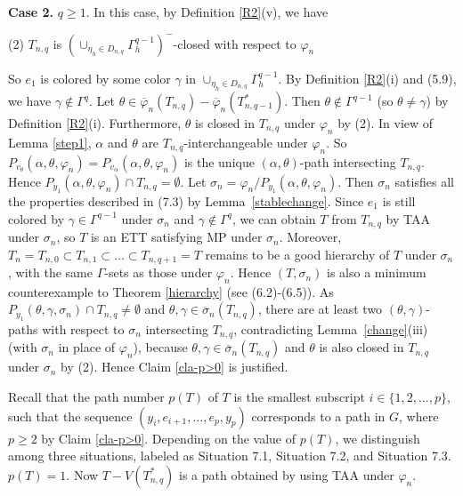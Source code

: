 \documentclass[11pt]{article}
\newcommand{\phibar}{\overline{\varphi}}
\begin{document}
{\bf Case 2.} $q\ge 1$. In this case, by Definition \ref{R2}(v), we have	

(2) $T_{n,q}$ is $(\cup_{\eta_h\in D_{n,q}}\Gamma^{q-1}_h)^-$-closed with respect to $\varphi_n$ 

\noindent So $e_1$ is colored by some color $\gamma$ in $\cup_{\eta_h\in D_{n,q}}\Gamma^{q-1}_h$. By Definition \ref{R2}(i) 
and (5.9), we have $\gamma \notin\Gamma^{q}$. Let $\theta\in\phibar_n(T_{n,q})-\phibar_n(T_{n,q-1}^*)$.
Then $\theta \notin \Gamma^{q-1}$ (so $\theta \neq\gamma$) by Definition \ref{R2}(i). Furthermore, 
$\theta$ is closed in $T_{n,q}$ under $\varphi_n$ by (2). In view of Lemma \ref{step1}, $\alpha$ and $\theta$ are $T_{n,q}$-interchangeable under $\varphi_n$. So  $P_{v_{\theta}}(\alpha,\theta,\varphi_n)=P_{v_{\alpha}}(\alpha,\theta,\varphi_n)$ 
is the unique $(\alpha,\theta)$-path intersecting $T_{n,q}$. Hence $P_{y_1}(\alpha,\theta,\varphi_n)\cap T_{n,q}=\emptyset$. 
Let $\sigma_n=\varphi_n/P_{y_1}(\alpha,\theta,\varphi_n)$. Then $\sigma_n$ satisfies all the properties described in (7.3) by Lemma~\ref{stablechange}. Since $e_1$ is still colored by $\gamma\in\Gamma^{q-1}$ under $\sigma_n$ and 
$\gamma\notin \Gamma^{q}$, we can obtain $T$ from $T_{n,q}$ by TAA under $\sigma_n$, so $T$ is an ETT satisfying MP under $\sigma_n$.  Moreover, $T_n=T_{n,0} \subset T_{n,1} \subset \ldots \subset T_{n,q+1}=T$ remains to be a good hierarchy of $T$ 
under $\sigma_n$, with the same $\Gamma$-sets as those under $\varphi_n$.  Hence $(T, \sigma_n)$ is also a minimum counterexample 
to Theorem \ref{hierarchy} (see (6.2)-(6.5)). As $P_{y_1}(\theta,\gamma,\sigma_n)\cap T_{n,q}\neq \emptyset$ and $\theta,\gamma\in\overline{\sigma}_n(T_{n,q})$, there are 
at least two $(\theta,\gamma)$-paths with respect to $\sigma_n$ intersecting $T_{n,q}$, contradicting Lemma~\ref{change}(iii) 
(with $\sigma_n$ in place of $\varphi_n$), because $\theta, \gamma\in \overline{\sigma}_n(T_{n,q})$ and $\theta$ is also 
closed in $T_{n,q}$ under $\sigma_n$ by (2). Hence Claim \ref{cla-p>0} is justified. 

\vskip 3mm
Recall that the path number $p(T)$ of $T$ is the smallest subscript $i\in \{1,2,...,p\}$, such that the sequence $(y_i,e_{i+1},...,e_p,y_p)$ corresponds to a path in $G$, where $p\ge 2$ by Claim \ref{cla-p>0}. Depending on 
the value of $p(T)$, we distinguish among three situations, labeled as Situation 7.1, Situation 7.2, and Situation 7.3. \\

 $p(T)=1$. Now $T - V(T_{n,q}^*)$ is a path obtained by using TAA under $\varphi_n$.
\end{document}
